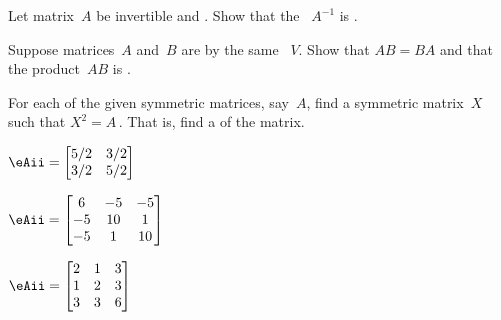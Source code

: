 \begin{exercise}  
Let matrix~\(A\) be invertible and .  
Show that the ~\(A^{-1}\) is .
\end{exercise}




\begin{exercise}  
Suppose matrices~\(A\) and~\(B\) are  by the same ~\(V\).  
Show that \(AB=BA\) and that the product~\(AB\) is .
\end{exercise}




\begin{exercise}  
For each of the given symmetric matrices, say~\(A\), find a symmetric matrix~\(X\) such that \(X^2=A\)\,.  
That is, find a  of the matrix.
\begin{Parts}
\item \(\eAii=\begin{bmatrix} 5/2&3/2
\\3/2&5/2 \end{bmatrix}\)

\item \(\eAii=\begin{bmatrix} 6&-5&-5
\\-5&10&1
\\-5&1&10 \end{bmatrix}\)

\item \(\eAii=\begin{bmatrix} 2&1&3
\\1&2&3
\\3&3&6 \end{bmatrix}\)


\end{Parts}
\end{exercise}
